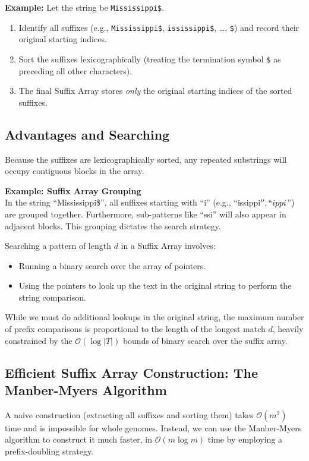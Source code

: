 \textbf{Example:} Let the string be \verb|Mississippi$|.
\begin{enumerate}
    \item Identify all suffixes (e.g., \verb|Mississippi$|, \verb|ississippi$|, \ldots, \verb|$|) and record their original starting indices.
    \item Sort the suffixes lexicographically (treating the termination symbol \verb|$| as preceding all other characters).
    \item The final Suffix Array stores \textit{only} the original starting indices of the sorted suffixes.
\end{enumerate}

\subsection{Advantages and Searching}
Because the suffixes are lexicographically sorted, any repeated substrings will occupy contiguous blocks in the array. 

\textbf{Example: Suffix Array Grouping}\\
In the string ``Mississippi\$'', all suffixes starting with ``i'' (e.g., ``issippi$'', ``ippi$'') are grouped together. Furthermore, sub-patterns like ``ssi'' will also appear in adjacent blocks. This grouping dictates the search strategy.

Searching a pattern of length \( d \) in a Suffix Array involves:
\begin{itemize}
    \item Running a binary search over the array of pointers.
    \item Using the pointers to look up the text in the original string to perform the string comparison.
\end{itemize}
While we must do additional lookups in the original string, the maximum number of prefix comparisons is proportional to the length of the longest match \( d \), heavily constrained by the \( \mathcal{O}(\log |T|) \) bounds of binary search over the suffix array.

\subsection{Efficient Suffix Array Construction: The Manber-Myers Algorithm}
A naive construction (extracting all suffixes and sorting them) takes \( \mathcal{O}(m^2) \) time and is impossible for whole genomes. Instead, we can use the Manber-Myers algorithm to construct it much faster, in \( \mathcal{O}(m \log m) \) time by employing a prefix-doubling strategy.

